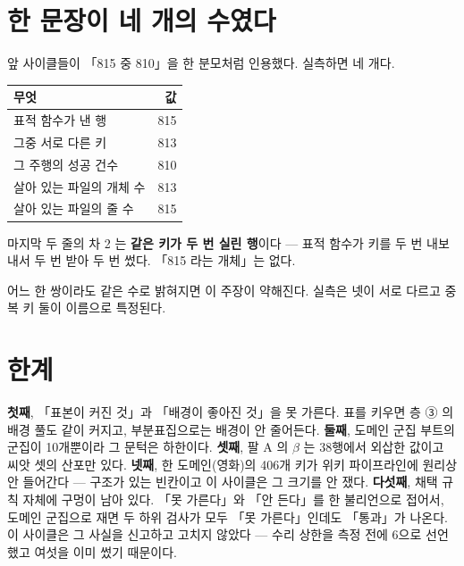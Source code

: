 \documentclass[10pt]{article}
\begin{document}
\section{한 문장이 네 개의 수였다}

앞 사이클들이 「815 중 810」을 한 분모처럼 인용했다. 실측하면 네 개다.

\begin{center}\small
\begin{tabular}{lr}
\hline
무엇 & 값 \\
\hline
표적 함수가 낸 행 & 815 \\
그중 서로 다른 키 & 813 \\
그 주행의 성공 건수 & 810 \\
살아 있는 파일의 개체 수 & 813 \\
살아 있는 파일의 줄 수 & 815 \\
\hline
\end{tabular}
\end{center}

마지막 두 줄의 차 2 는 \textbf{같은 키가 두 번 실린 행}이다 --- 표적 함수가 키를 두 번
내보내서 두 번 받아 두 번 썼다. 「815 라는 개체」는 없다.

{어느 한 쌍이라도 같은 수로 밝혀지면 이 주장이 약해진다. 실측은 넷이 서로 다르고
중복 키 둘이 이름으로 특정된다.}

\section{한계}

\textbf{첫째}, 「표본이 커진 것」과 「배경이 좋아진 것」을 못 가른다. 표를 키우면 층 ③ 의
배경 풀도 같이 커지고, 부분표집으로는 배경이 안 줄어든다. \textbf{둘째}, 도메인 군집
부트의 군집이 10개뿐이라 그 문턱은 하한이다. \textbf{셋째}, 팔 A 의 $\beta$ 는 38행에서
외삽한 값이고 씨앗 셋의 산포만 있다. \textbf{넷째}, 한 도메인(영화)의 406개 키가 위키
파이프라인에 원리상 안 들어간다 --- 구조가 있는 빈칸이고 이 사이클은 그 크기를 안 쟀다.
\textbf{다섯째}, 채택 규칙 자체에 구멍이 남아 있다. 「못 가른다」와 「안 든다」를 한
불리언으로 접어서, 도메인 군집으로 재면 두 하위 검사가 모두 「못 가른다」인데도
「통과」가 나온다. 이 사이클은 그 사실을 신고하고 고치지 않았다 --- 수리 상한을 측정
전에 6으로 선언했고 여섯을 이미 썼기 때문이다.
\end{document}
